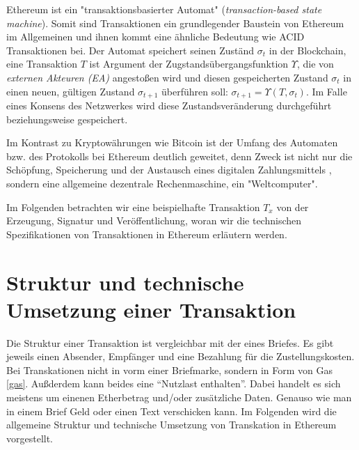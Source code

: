 \documentclass[runningheads]{llncs}
\begin{document}
Ethereum ist ein "transaktionsbasierter Automat" (\textit{transaction-based state machine}). Somit sind Transaktionen ein grundlegender Baustein von Ethereum im Allgemeinen und ihnen kommt eine ähnliche Bedeutung wie ACID Transaktionen bei. Der Automat speichert seinen Zuständ $ \sigma_t $ in der Blockchain, eine Transaktion $ T $ ist Argument der Zugstandsübergangsfunktion $ \Upsilon $, die von \textit{externen Akteuren (EA)} angestoßen wird und diesen gespeicherten Zustand $ \sigma_t $ in einen neuen, gültigen Zustand $ \sigma_{t + 1} $ überführen soll: $\sigma_{t+1} = \Upsilon(T, \sigma_t) $. Im Falle eines Konsens des Netzwerkes wird diese Zustandsveränderung durchgeführt beziehungsweise gespeichert.

Im Kontrast zu Kryptowährungen wie Bitcoin ist der Umfang des Automaten bzw. des Protokolls bei Ethereum deutlich geweitet, denn Zweck ist nicht nur die Schöpfung, Speicherung und der Austausch eines digitalen Zahlungsmittels \cite{nakamoto_bitcoin_nodate}, sondern eine allgemeine dezentrale Rechenmaschine, ein "Weltcomputer".  \cite[S. 1-4]{wood_ethereum/yellowpaper_2019}

Im Folgenden betrachten wir eine beispielhafte Transaktion $ T_x $ von der Erzeugung, Signatur und Veröffentlichung, woran wir die technischen Spezifikationen von Transaktionen in Ethereum erläutern werden.

\section{Struktur und technische Umsetzung einer Transaktion}

Die Struktur einer Transaktion ist vergleichbar mit der eines Briefes. Es gibt jeweils einen Absender, Empfänger und eine Bezahlung für die Zustellungskosten. Bei Transkationen nicht in vorm einer Briefmarke, sondern in Form von Gas \ref{gas}. Außderdem kann beides eine "`Nutzlast enthalten"'. Dabei handelt es sich meistens um einenen Etherbetrag und/oder zusätzliche Daten. Genauso wie man in einem Brief Geld oder einen Text verschicken kann. Im Folgenden wird die allgemeine Struktur und technische Umsetzung von Transkation in Ethereum vorgestellt.
\end{document}
